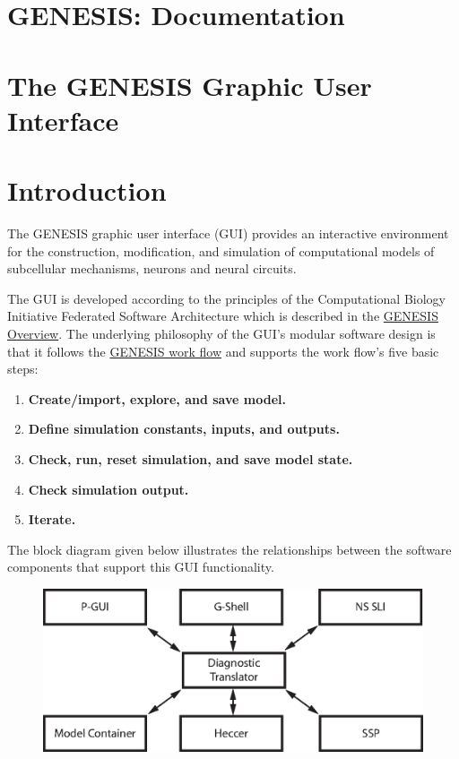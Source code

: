 \documentclass[12pt]{article}
\begin{document}
\section*{GENESIS: Documentation}

\section*{The GENESIS Graphic User Interface}

\section*{Introduction}

The GENESIS graphic user interface (GUI) provides an interactive environment for the construction, modification, and simulation of computational models of subcellular mechanisms, neurons and neural circuits.

The GUI is developed according to the principles of the Computational Biology Initiative Federated Software Architecture which is described in the \href{../genesis-overview/genesis-overview.tex}{GENESIS Overview}. The underlying philosophy of the GUI's modular software design is that it follows the \href{../work-flow/work-flow.tex}{GENESIS work flow} and supports the work flow's five basic steps:
\begin{enumerate}
\item {\bf Create/import, explore, and save model.}
\item {\bf Define simulation constants, inputs, and outputs.}
\item {\bf Check, run, reset simulation, and save model state.}
\item {\bf Check simulation output.}
\item {\bf Iterate.}
\end{enumerate}
The block diagram given below illustrates the relationships between the software components that support this GUI functionality.

\begin{figure}[h]
  \centering
\includegraphics[scale=0.6]{figures/gui-isolated.eps}
  \label{fig:df-1}
\end{figure}
\end{document}
